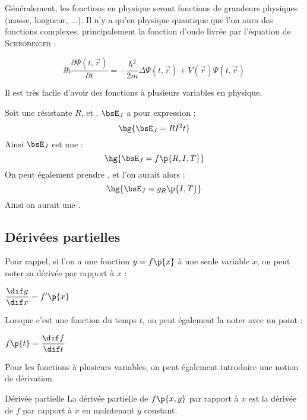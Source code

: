     Généralement, les fonctions en physique seront fonctions de grandeurs physiques (masse, longueur, ...). Il n'y a qu'en physique quantique que l'on aura des fonctions complexes, principalement la fonction d'onde livrée par l'équation de \textsc{Schrödinger} :
    
    \[ \displaystyle \ii\hbar {\frac {\partial \Psi (t,{\vec {r}})}{\partial t}}=-{\frac {\hbar ^{2}}{2m}}\Delta \Psi (t,{\vec {r}})+V({\vec {r}})\Psi (t,{\vec {r}}) \]
    
    Il est très facile d'avoir des fonctions à plusieurs variables en physique. 
    
    \begin{example}{}{}
        Soit une résistante $R$, et . $\bsE_J$ a pour expression :
        \[ \hg{\bsE_J = RI^2t} \]
        Ainsi $\bsE_J$ est une  :
        \[ \hg{\bsE_J = f\p{R, I, T}} \]
        On peut également prendre , et l'on aurait alors :
        \[ \hg{\bsE_J = g_R\p{I, T}} \]
        Ainsi on aurait une .
    \end{example}
    
    \subsection{Dérivées partielles}
    
    Pour rappel, si l'on a une fonction $y = f\p{x}$ à une seule variable $x$, on peut noter sa dérivée par rapport à $x$ :
    
    \begin{notation}
        $\dfrac{\dif y}{\dif x} = f'\p{x}$
    \end{notation}
    
    Lorsque c'est une fonction du temps $t$, on peut également la noter avec un point :
    
    \begin{notation}
        $\dot f\p{t} = \dfrac{\dif f}{\dif t}$
    \end{notation}
    
    Pour les fonctions à plusieurs variables, on peut également introduire une notion de dérivation.
    
    \begin{definition}{Dérivée partielle}
        La dérivée partielle de $f\p{x, y}$ par rapport à $x$ est la dérivée de $f$ par rapport à $x$ en maintenant $y$ constant.
    \end{definition}
    
